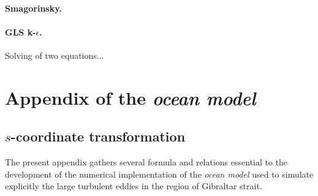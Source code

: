 \paragraph{Smagorinsky.}
\citep{smagorinky_1963}


\paragraph{GLS k-$\epsilon$.}
\citep{umlauf_2003}
Solving of two equations...


\section{Appendix of the \textit{ocean model}}
\label{annexe_ocmod}

\subsection{$s$-coordinate transformation}
\label{section_annexe2}
\color{blue}The present appendix gathers several formula and relations essential to the development of the numerical implementation of the \textit{ocean model} used to simulate explicitly the large turbulent eddies in the region of Gibraltar strait.\color{black}
%
